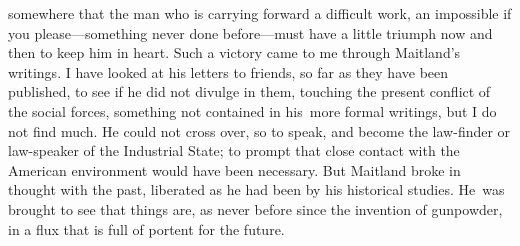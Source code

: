 \documentclass[twoside,symmetric,nobib,justified]{tufte-book}
\begin{document}
somewhere that the man who is carrying forward a difficult work, an
impossible if you please---something never done before---must have a
little triumph now and then to keep him in heart. Such a victory came to
me through Maitland's writings. I have looked at his letters to friends,
so far as they have been published, to see if he did not divulge in
them, touching the present conflict of the social forces, something not
contained in his~more formal writings, but I do not find much. He could
not cross over, so to speak, and become the law-finder or law-speaker of
the Industrial State; to prompt that close contact with the American
environment would have been necessary. But Maitland broke in thought
with the past, liberated as he had been by his historical studies.
He~was brought to see that things are, as never before since the
invention of gunpowder, in a flux that is full of portent for the
future.~~
\end{document}
